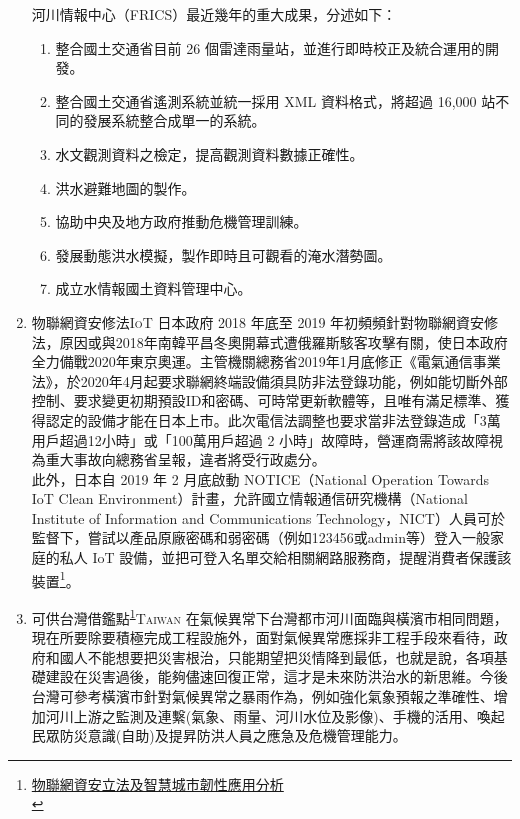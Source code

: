\documentclass[a4paper,12pt]{article}
\begin{document}
\begin{enumerate}
河川情報中心（FRICS）最近幾年的重大成果，分述如下：\\
\begin{enumerate}
\item 整合國土交通省目前 26 個雷達雨量站，並進行即時校正及統合運用的開發。\\
\item 整合國土交通省遙測系統並統一採用 XML 資料格式，將超過 16,000 站不同的發展系統整合成單一的系統。\\
\item 水文觀測資料之檢定，提高觀測資料數據正確性。\\
\item 洪水避難地圖的製作。\\
\item 協助中央及地方政府推動危機管理訓練。\\
\item 發展動態洪水模擬，製作即時且可觀看的淹水潛勢圖。\\
\item 成立水情報國土資料管理中心。\\
\end{enumerate}

\item 物聯網資安修法\hfill{}\textsc{IoT}
\label{sec:org1c7eba9}
日本政府 2018 年底至 2019 年初頻頻針對物聯網資安修法，原因或與2018年南韓平昌冬奧開幕式遭俄羅斯駭客攻擊有關，使日本政府全力備戰2020年東京奧運。主管機關總務省2019年1月底修正《電氣通信事業法》，於2020年4月起要求聯網終端設備須具防非法登錄功能，例如能切斷外部控制、要求變更初期預設ID和密碼、可時常更新軟體等，且唯有滿足標準、獲得認定的設備才能在日本上市。此次電信法調整也要求當非法登錄造成「3萬用戶超過12小時」或「100萬用戶超過 2 小時」故障時，營運商需將該故障視為重大事故向總務省呈報，違者將受行政處分。\\

此外，日本自 2019 年 2 月底啟動 NOTICE（National Operation Towards IoT Clean Environment）計畫，允許國立情報通信研究機構（National Institute of Information and Communications Technology，NICT）人員可於監督下，嘗試以產品原廠密碼和弱密碼（例如123456或admin等）登入一般家庭的私人 IoT 設備，並把可登入名單交給相關網路服務商，提醒消費者保護該裝置\footnote{\href{https://technews.tw/2019/04/17/iot-law-and-resilient-cities/}{物聯網資安立法及智慧城市韌性應用分析}\\\label{orgb142a54}}。\\

\item 可供台灣借鑑點\textsuperscript{\ref{orgb142a54}}\hfill{}\textsc{Taiwan}
\label{sec:org2f0393e}
在氣候異常下台灣都市河川面臨與橫濱市相同問題，現在所要除要積極完成工程設施外，面對氣候異常應採非工程手段來看待，政府和國人不能想要把災害根治，只能期望把災情降到最低，也就是說，各項基礎建設在災害過後，能夠儘速回復正常，這才是未來防洪治水的新思維。今後台灣可參考橫濱市針對氣候異常之暴雨作為，例如強化氣象預報之準確性、增加河川上游之監測及連繫(氣象、雨量、河川水位及影像)、手機的活用、喚起民眾防災意識(自助)及提昇防洪人員之應急及危機管理能力。\\


\end{enumerate}
\end{document}
